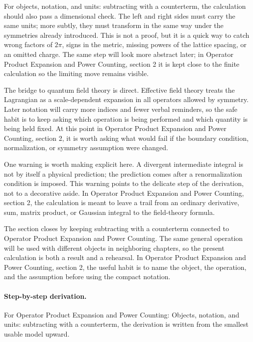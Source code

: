 For objects, notation, and units: subtracting with a counterterm, the calculation should also pass a dimensional check.  The left and right sides must carry the same units; more subtly, they must transform in the same way under the symmetries already introduced.  This is not a proof, but it is a quick way to catch wrong factors of \(2\pi\), signs in the metric, missing powers of the lattice spacing, or an omitted charge.  The same step will look more abstract later; in Operator Product Expansion and Power Counting, section 2 it is kept close to the finite calculation so the limiting move remains visible.

The bridge to quantum field theory is direct.  Effective field theory treats the Lagrangian as a scale-dependent expansion in all operators allowed by symmetry.  Later notation will carry more indices and fewer verbal reminders, so the safe habit is to keep asking which operation is being performed and which quantity is being held fixed.  At this point in Operator Product Expansion and Power Counting, section 2, it is worth asking what would fail if the boundary condition, normalization, or symmetry assumption were changed.

One warning is worth making explicit here.  A divergent intermediate integral is not by itself a physical prediction; the prediction comes after a renormalization condition is imposed.  This warning points to the delicate step of the derivation, not to a decorative aside.  In Operator Product Expansion and Power Counting, section 2, the calculation is meant to leave a trail from an ordinary derivative, sum, matrix product, or Gaussian integral to the field-theory formula.

The section closes by keeping subtracting with a counterterm connected to Operator Product Expansion and Power Counting.  The same general operation will be used with different objects in neighboring chapters, so the present calculation is both a result and a rehearsal.  In Operator Product Expansion and Power Counting, section 2, the useful habit is to name the object, the operation, and the assumption before using the compact notation.



\paragraph{Step-by-step derivation.}

For Operator Product Expansion and Power Counting: Objects, notation, and units: subtracting with a counterterm, the derivation is written from the smallest usable model upward.


